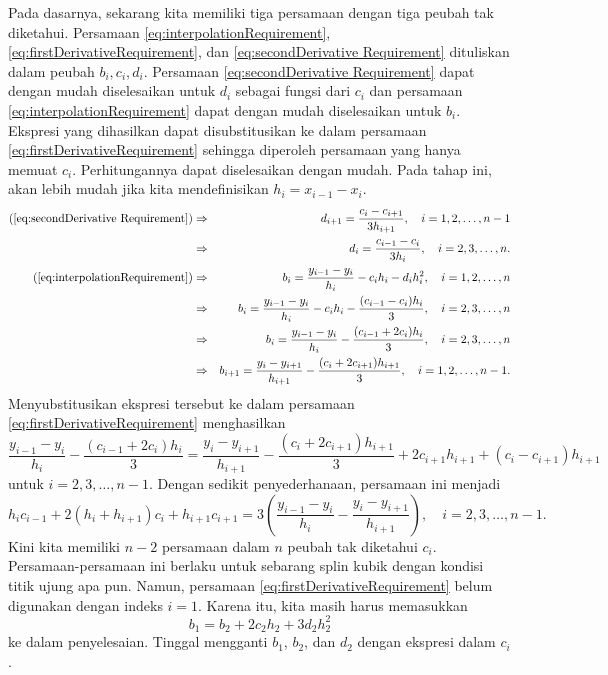 Pada dasarnya, sekarang kita memiliki tiga persamaan dengan tiga peubah
tak diketahui. Persamaan \ref{eq:interpolationRequirement}, \ref{eq:firstDerivativeRequirement},
dan \ref{eq:secondDerivative Requirement} dituliskan dalam peubah
$b_{i},c_{i},d_{i}$. Persamaan \ref{eq:secondDerivative Requirement}
dapat dengan mudah diselesaikan untuk $d_{i}$ sebagai fungsi dari
$c_{i}$ dan persamaan \ref{eq:interpolationRequirement} dapat dengan
mudah diselesaikan untuk $b_{i}$. Ekspresi yang dihasilkan dapat
disubstitusikan ke dalam persamaan \ref{eq:firstDerivativeRequirement}
sehingga diperoleh persamaan yang hanya memuat $c_{i}$. Perhitungannya
dapat diselesaikan dengan mudah. Pada tahap ini, akan lebih mudah
jika kita mendefinisikan $h_{i}=x_{i-1}-x_{i}$. 
\begin{eqnarray}
(\mbox{\ref{eq:secondDerivative Requirement}}) & \Rightarrow & d_{i+1}=\frac{c_{i}-c_{i+1}}{3h_{i+1}},\quad i=1,2,\ldots,n-1\nonumber \\
 & \Rightarrow & d_{i}=\frac{c_{i-1}-c_{i}}{3h_{i}},\quad i=2,3,\ldots,n.\label{eq:di}\\
(\mbox{\ref{eq:interpolationRequirement}}) & \Rightarrow & b_{i}=\frac{y_{i-1}-y_{i}}{h_{i}}-c_{i}h_{i}-d_{i}h_{i}^{2},\quad i=1,2,\ldots,n\nonumber \\
 & \Rightarrow & b_{i}=\frac{y_{i-1}-y_{i}}{h_{i}}-c_{i}h_{i}-\frac{(c_{i-1}-c_{i})h_{i}}{3},\quad i=2,3,\ldots,n\nonumber \\
 & \Rightarrow & b_{i}=\frac{y_{i-1}-y_{i}}{h_{i}}-\frac{(c_{i-1}+2c_{i})h_{i}}{3},\quad i=2,3,\ldots,n\label{eq:bi}\\
 & \Rightarrow & b_{i+1}=\frac{y_{i}-y_{i+1}}{h_{i+1}}-\frac{(c_{i}+2c_{i+1})h_{i+1}}{3},\quad i=1,2,\ldots,n-1.\nonumber 
\end{eqnarray}
Menyubstitusikan ekspresi tersebut ke dalam persamaan \ref{eq:firstDerivativeRequirement}
menghasilkan
\[
\frac{y_{i-1}-y_{i}}{h_{i}}-\frac{(c_{i-1}+2c_{i})h_{i}}{3}=\frac{y_{i}-y_{i+1}}{h_{i+1}}-\frac{(c_{i}+2c_{i+1})h_{i+1}}{3}+2c_{i+1}h_{i+1}+(c_{i}-c_{i+1})h_{i+1}
\]
untuk $i=2,3,\ldots,n-1$. Dengan sedikit penyederhanaan, persamaan
ini menjadi
\begin{equation}
h_{i}c_{i-1}+2(h_{i}+h_{i+1})c_{i}+h_{i+1}c_{i+1}=3\left(\frac{y_{i-1}-y_{i}}{h_{i}}-\frac{y_{i}-y_{i+1}}{h_{i+1}}\right),\quad i=2,3,\ldots,n-1.\label{eq:firstNm2}
\end{equation}
Kini kita memiliki $n-2$ persamaan dalam $n$ peubah tak diketahui
$c_{i}$. Persamaan-persamaan ini berlaku untuk sebarang splin kubik
dengan kondisi titik ujung apa pun. Namun, persamaan \ref{eq:firstDerivativeRequirement}
belum digunakan dengan indeks $i=1$. Karena itu, kita masih harus
memasukkan
\begin{equation}
b_{1}=b_{2}+2c_{2}h_{2}+3d_{2}h_{2}^{2}\label{eq:lastEquation}
\end{equation}
ke dalam penyelesaian. Tinggal mengganti $b_{1}$, $b_{2}$, dan $d_{2}$
dengan ekspresi dalam $c_{i}$. 

